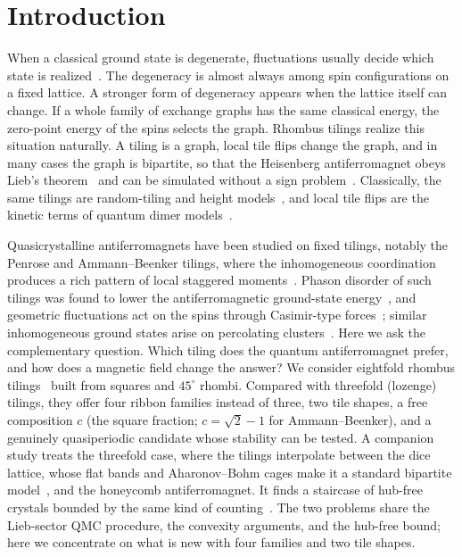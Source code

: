 \documentclass[aps,prb,twocolumn,superscriptaddress,floatfix]{revtex4-2}
\begin{document}
\maketitle

\section{Introduction}

When a classical ground state is degenerate, fluctuations usually decide which state is realized~\cite{Villain1980,Henley1989,Henley2006}. The degeneracy is almost always among spin configurations on a fixed lattice. A stronger form of degeneracy appears when the lattice itself can change. If a whole family of exchange graphs has the same classical energy, the zero-point energy of the spins selects the graph. Rhombus tilings realize this situation naturally. A tiling is a graph, local tile flips change the graph, and in many cases the graph is bipartite, so that the Heisenberg antiferromagnet obeys Lieb's theorem~\cite{LiebMattis1962,Lieb1989} and can be simulated without a sign problem~\cite{Sandvik1999,Syljuasen2002,Sandvik2010}. Classically, the same tilings are random-tiling and height models~\cite{BloteHilhorst1982,Henley1991,KOS2006}, and local tile flips are the kinetic terms of quantum dimer models~\cite{Rokhsar1988,Moessner2001,Moessner2001b}.

Quasicrystalline antiferromagnets have been studied on fixed tilings, notably the Penrose and Ammann--Beenker tilings, where the inhomogeneous coordination produces a rich pattern of local staggered moments~\cite{Wessel2003,Jagannathan2004,Jagannathan2006,Szallas2008,Jagannathan2012}. Phason disorder of such tilings was found to lower the antiferromagnetic ground-state energy~\cite{Szallas2009}, and geometric fluctuations act on the spins through Casimir-type forces~\cite{Jagannathan2013}; similar inhomogeneous ground states arise on percolating clusters~\cite{WangSandvik2006}. Here we ask the complementary question. Which tiling does the quantum antiferromagnet prefer, and how does a magnetic field change the answer? We consider eightfold rhombus tilings~\cite{Beenker1982,Ammann1992} built from squares and $45^\circ$ rhombi. Compared with threefold (lozenge) tilings, they offer four ribbon families instead of three, two tile shapes, a free composition $c$ (the square fraction; $c=\sqrt2-1$ for Ammann--Beenker), and a genuinely quasiperiodic candidate whose stability can be tested. A companion study treats the threefold case, where the tilings interpolate between the dice lattice, whose flat bands and Aharonov--Bohm cages make it a standard bipartite model~\cite{Sutherland1986,Vidal1998}, and the honeycomb antiferromagnet. It finds a staircase of hub-free crystals bounded by the same kind of counting~\cite{Yoo2026}. The two problems share the Lieb-sector QMC procedure, the convexity arguments, and the hub-free bound; here we concentrate on what is new with four families and two tile shapes.
\end{document}
